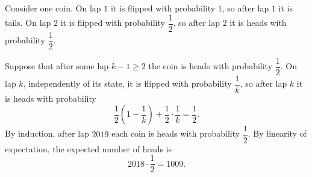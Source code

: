 Consider one coin. On lap $1$ it is flipped with probability $1$, so after lap $1$ it is tails. On lap $2$ it is flipped with probability $\dfrac12$, so after lap $2$ it is heads with probability $\dfrac12$.

Suppose that after some lap $k-1\ge2$ the coin is heads with probability $\dfrac12$. On lap $k$, independently of its state, it is flipped with probability $\dfrac1k$, so after lap $k$ it is heads with probability
\[\dfrac12\left(1-\dfrac1k\right)+\dfrac12\cdot\dfrac1k=\dfrac12.\]
By induction, after lap $2019$ each coin is heads with probability $\dfrac12$. By linearity of expectation, the expected number of heads is
\[2018\cdot\dfrac12=\boxed{1009}.\]
